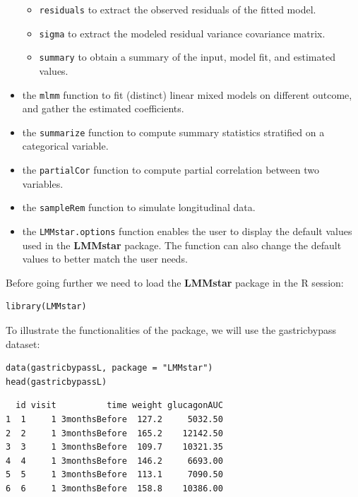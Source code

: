 \documentclass[12pt]{article}
\begin{document}
\begin{itemize}
\begin{itemize}
\item \texttt{residuals} to extract the observed residuals of the fitted model.
\item \texttt{sigma} to extract the modeled residual variance covariance matrix.
\item \texttt{summary} to obtain a summary of the input, model fit, and estimated values.
\end{itemize}
\item the \texttt{mlmm} function to fit (distinct) linear mixed models on
different outcome, and gather the estimated coefficients.
\item the \texttt{summarize} function to compute summary statistics stratified on a categorical variable.
\item the \texttt{partialCor} function to compute partial correlation between two variables.
\item the \texttt{sampleRem} function to simulate longitudinal data.
\item the \texttt{LMMstar.options} function enables the user to display the
default values used in the \textbf{LMMstar} package. The function
can also change the default values to better match the user needs.
\end{itemize}

\bigskip

Before going further we need to load the \textbf{LMMstar} package in the R
session:
\lstset{language=r,label= ,caption= ,captionpos=b,numbers=none}
\begin{lstlisting}
library(LMMstar)
\end{lstlisting}

To illustrate the functionalities of the package, we will use the
gastricbypass dataset:
\lstset{language=r,label= ,caption= ,captionpos=b,numbers=none}
\begin{lstlisting}
data(gastricbypassL, package = "LMMstar")
head(gastricbypassL)
\end{lstlisting}

\begin{verbatim}
  id visit          time weight glucagonAUC
1  1     1 3monthsBefore  127.2     5032.50
2  2     1 3monthsBefore  165.2    12142.50
3  3     1 3monthsBefore  109.7    10321.35
4  4     1 3monthsBefore  146.2     6693.00
5  5     1 3monthsBefore  113.1     7090.50
6  6     1 3monthsBefore  158.8    10386.00
\end{verbatim}
\end{document}
